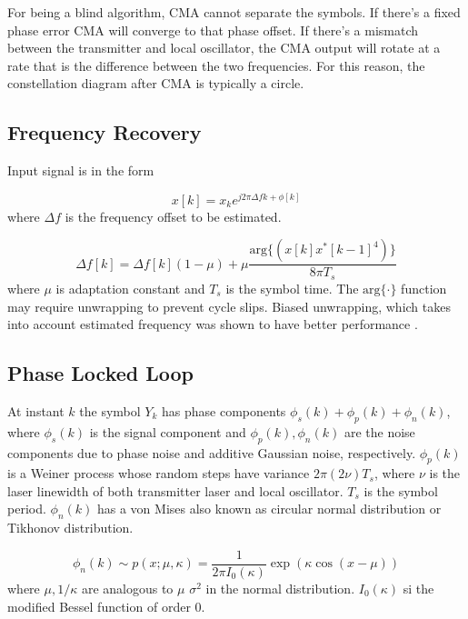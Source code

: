 \documentclass[a4paper]{article}
\begin{document}
For being a blind algorithm, CMA cannot separate the symbols. If there's a fixed phase error CMA will converge to that phase offset. If there's a mismatch between the transmitter and local oscillator, the CMA output will rotate at a rate that is the difference between the two frequencies. For this reason, the constellation diagram after CMA is typically a circle. 


\subsection{Frequency Recovery}
\cite{Hoffmann2008} 

Input signal is in the form

\begin{equation}
x[k] = x_ke^{j2\pi\Delta fk + \phi[k]}
\end{equation}
where $\Delta f$ is the frequency offset to be estimated.

\begin{equation}
\Delta f[k] = \Delta f[k](1-\mu) + \mu\frac{\mathrm{arg}\{(x[k]x^*[k-1]^4)\}}{8\pi T_s}
\end{equation}
where $\mu$ is adaptation constant and $T_s$ is the symbol time. The $\mathrm{arg}\{\cdot\}$ function may require unwrapping to prevent cycle slips. Biased unwrapping, which takes into account estimated frequency was shown to have better performance \cite{Hoffmann2008}.

\subsection{Phase Locked Loop}

At instant $k$ the symbol $Y_k$ has phase components $\phi_s(k) + \phi_p(k) + \phi_n(k)$, where $\phi_s(k)$ is the signal component and  $\phi_p(k), \phi_n(k)$ are the noise components due to phase noise and additive Gaussian noise, respectively. $\phi_p(k)$ is a Weiner process whose random steps have variance $2\pi(2\nu)T_s$, where $\nu$ is the laser linewidth of both transmitter laser and local oscillator. $T_s$ is the symbol period. $\phi_n(k)$ has a von Mises also known as circular normal distribution or Tikhonov distribution.

\begin{equation} \label{eq:Tikhonov-pdf}
	\phi_n(k) \sim p(x; \mu, \kappa) = \frac{1}{2\pi I_0(\kappa)}\exp(\kappa\cos(x-\mu))
\end{equation}
where $\mu, 1/\kappa$ are analogous to $\mu$ $\sigma^2$ in the normal distribution. $I_0(\kappa)$ si the modified Bessel function of order 0.
\end{document}
